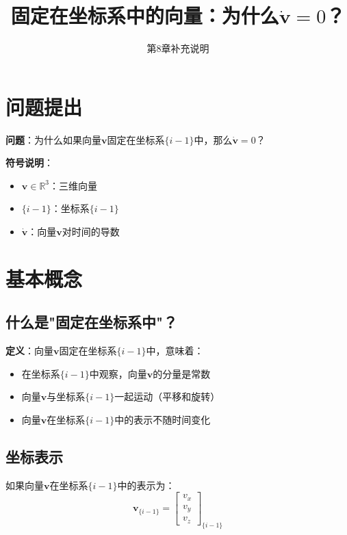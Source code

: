 \documentclass[12pt,a4paper]{article}
\title{固定在坐标系中的向量：为什么$\dot{\mathbf{v}} = 0$？}
\author{第8章补充说明}
\date{}
\begin{document}
\maketitle

\section{问题提出}

\textbf{问题}：为什么如果向量$\mathbf{v}$固定在坐标系$\{i-1\}$中，那么$\dot{\mathbf{v}} = 0$？

\textbf{符号说明}：
\begin{itemize}
\item $\mathbf{v} \in \mathbb{R}^3$：三维向量
\item $\{i-1\}$：坐标系$\{i-1\}$
\item $\dot{\mathbf{v}}$：向量$\mathbf{v}$对时间的导数
\end{itemize}

\section{基本概念}

\subsection{什么是"固定在坐标系中"？}

\textbf{定义}：向量$\mathbf{v}$固定在坐标系$\{i-1\}$中，意味着：
\begin{itemize}
\item 在坐标系$\{i-1\}$中观察，向量$\mathbf{v}$的分量是常数
\item 向量$\mathbf{v}$与坐标系$\{i-1\}$一起运动（平移和旋转）
\item 向量$\mathbf{v}$在坐标系$\{i-1\}$中的表示不随时间变化
\end{itemize}

\subsection{坐标表示}

如果向量$\mathbf{v}$在坐标系$\{i-1\}$中的表示为：
\begin{equation}
\mathbf{v}_{\{i-1\}} = \begin{bmatrix} v_x \\ v_y \\ v_z \end{bmatrix}_{\{i-1\}}
\end{equation}
\end{document}
